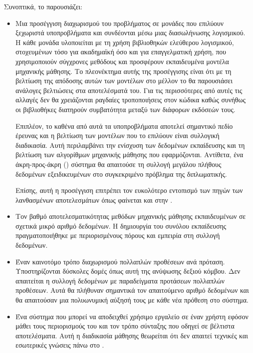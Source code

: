 Συνοπτικά, το \projectname{} παρουσιάζει:
\begin{itemize}
    \item Μια προσέγγιση διαχωρισμού του προβλήματος σε μονάδες που επιλύουν ξεχωριστά υποπροβλήματα και συνδέονται μέσω μιας διασωλήνωσης λογισμικού.
          Η κάθε μονάδα υλοποιείται με τη χρήση βιβλιοθηκών ελεύθερου λογισμικού, στοχευμένων τόσο για ακαδημαϊκή όσο και για επαγγελματική χρήση, που χρησιμοποιούν σύγχρονες μεθόδους και προσφέρουν εκπαιδευμένα μοντέλα μηχανικής μάθησης.
          Το πλεονέκτημα αυτής της προσέγγισης είναι ότι με τη βελτίωση της απόδοσης αυτών των μοντέλων στο μέλλον το \projectname{} θα παρουσιάσει ανάλογες βελτιώσεις στα αποτελέσματά του.
          Για τις περισσότερες από αυτές τις αλλαγές δεν θα χρειάζονται ραγδαίες τροποποιήσεις στον κώδικα καθώς συνήθως οι βιβλιοθήκες διατηρούν συμβατότητα μεταξύ των διάφορων εκδόσεών τους.

          Επιπλέον, το καθένα από αυτά τα υποπροβλήματα αποτελεί σημαντικό πεδίο έρευνας και η βελτίωση των μοντέλων που το επιλύουν είναι συλλογική διαδικασία.
          Αυτή περιλαμβάνει την ενίσχυση των δεδομένων εκπαίδευσης και τη βελτίωση των αλγορίθμων μηχανικής μάθησης που εφαρμόζονται.
          Αντίθετα, ένα άκρη-προς-άκρη () σύστημα θα απαιτούσε τη συλλογή μεγάλου πλήθους δεδομένων εξειδικευμένων στο συγκεκριμένο πρόβλημα της διπλωματικής.

          Επίσης, αυτή η προσέγγιση επιτρέπει τον ευκολότερο εντοπισμό των πηγών των λανθασμένων αποτελεσμάτων όπως φαίνεται και στην .
    \item Τον βαθμό αποτελεσματικότητας μεθόδων μηχανικής μάθησης εκπαιδευμένων σε σχετικά μικρό αριθμό δεδομένων.
          Η δημιουργία του συνόλου εκπαίδευσης πραγματοποιήθηκε με περιορισμένους πόρους και εμπειρία στη συλλογή δεδομένων.
    \item Έναν καινοτόμο τρόπο διαχωρισμού πολλαπλών προθέσεων ανά πρόταση.
          Υποστηρίζονται δύσκολες δομές όπως αυτή της ανύψωσης δεξιού κόμβου.
          Δεν απαιτείται η συλλογή δεδομένων με παραδείγματα προτάσεων πολλαπλών προθέσεων.
          Αυτά θα πλήθυναν σημαντικά τον απαιτούμενο αριθμό δεδομένων και θα απαιτούσαν μια πολυωνυμική αύξησή τους με κάθε νέα πρόθεση στο σύστημα.
    \item Ένα σύστημα που μπορεί να αποδειχθεί χρήσιμο εργαλείο σε έναν χρήστη εφόσον μάθει τους περιορισμούς του και τον τρόπο σύνταξης που οδηγεί σε βέλτιστα αποτελέσματα.
          Αυτή η διαδικασία μάθησης θεωρείται ότι δεν απαιτεί τεχνικές και εσωτερικές γνώσεις πάνω στο \projectname{}.
\end{itemize}

